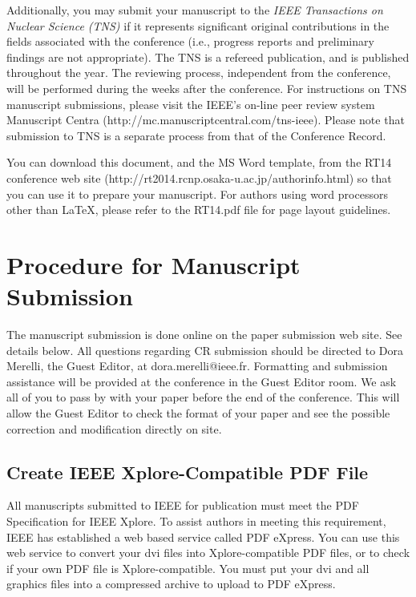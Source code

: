 \documentclass[journal]{IEEEtran}
\begin{document}


Additionally, you may submit your manuscript to the \emph{IEEE Transactions on Nuclear Science (TNS)} if it represents significant original contributions in the fields associated with the conference (i.e., progress reports and preliminary findings are not appropriate).  The TNS is a refereed publication, and is published throughout the year. The reviewing process, independent from the conference, will be performed during the weeks after the conference. For instructions on TNS  manuscript submissions, please visit the IEEE's on-line peer review system Manuscript Centra   (http://mc.manuscriptcentral.com/tns-ieee). Please note that submission to TNS  is a separate process from that of the Conference Record.

You can download this document, and the MS Word template, from the RT14 conference web site (http://rt2014.rcnp.osaka-u.ac.jp/authorinfo.html) so that you can use it to prepare your manuscript.  For authors using word processors other than {\LaTeX}, please refer to the RT14.pdf file for page layout guidelines. 


\section{Procedure for Manuscript Submission}

The manuscript submission is done online on the paper submission web site.  See details below. All questions regarding CR submission should be directed to Dora Merelli, the Guest Editor, at dora.merelli@ieee.fr. Formatting and submission assistance will be provided at the conference in the Guest Editor room. We ask all of you to pass by with your paper before the end of the conference. This will allow the Guest Editor to check the format of your paper and see the possible correction and modification directly on site.

\subsection{Create IEEE Xplore-Compatible PDF File}

All manuscripts submitted to IEEE for publication must meet the PDF Specification for IEEE Xplore\cite{IEEEPDFRequirement401}. To assist authors in meeting this requirement, IEEE has established a web based service called PDF eXpress. You can use this web service to convert your dvi  files into Xplore-compatible PDF files, or to check if your own PDF file is Xplore-compatible. You must put your dvi and all graphics files into a compressed archive to upload to PDF eXpress.
\end{document}
